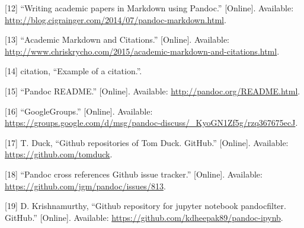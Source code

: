 \documentclass[journal,10pt,final]{IEEEtran}
\begin{document}
\hypertarget{ref-ux5fwriting-1}{}
{[}12{]} ``Writing academic papers in Markdown using Pandoc.''
{[}Online{]}. Available:
\url{http://blog.cigrainger.com/2014/07/pandoc-markdown.html}.

\hypertarget{ref-ux5facademic}{}
{[}13{]} ``Academic Markdown and Citations.'' {[}Online{]}. Available:
\url{http://www.chriskrycho.com/2015/academic-markdown-and-citations.html}.

\hypertarget{ref-citationux5fexample}{}
{[}14{]} citation, ``Example of a citation.''.

\hypertarget{ref-ux5fpandoc}{}
{[}15{]} ``Pandoc README.'' {[}Online{]}. Available:
\url{http://pandoc.org/README.html}.

\hypertarget{ref-ux5fgooglegroups}{}
{[}16{]} ``GoogleGroups.'' {[}Online{]}. Available:
\url{https://groups.google.com/d/msg/pandoc-discuss/_KyoGN1Zf5g/rzq367675ecJ}.

\hypertarget{ref-duckux5fgithub}{}
{[}17{]} T. Duck, ``Github repositories of Tom Duck. GitHub.''
{[}Online{]}. Available: \url{https://github.com/tomduck}.

\hypertarget{ref-ux5fpandoc-1}{}
{[}18{]} ``Pandoc cross references Github issue tracker.'' {[}Online{]}.
Available: \url{https://github.com/jgm/pandoc/issues/813}.

\hypertarget{ref-krishnamurthyux5fgithub-1}{}
{[}19{]} D. Krishnamurthy, ``Github repository for jupyter notebook
pandocfilter. GitHub.'' {[}Online{]}. Available:
\url{https://github.com/kdheepak89/pandoc-ipynb}.
\end{document}
